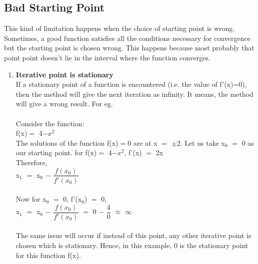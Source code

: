 \documentclass[15pt]{report}
\begin{document}
\subsection*{Bad Starting Point}
This kind of limitation happens when the choice of starting point is wrong. Sometimes, a good function satisfies all the conditions necessary for convergence but the starting point is chosen wrong. This happens because most probably that point point doesn't lie in the interval where the function converges.   
\begin{enumerate}
\item \textbf{Iterative point is stationary}\\If a stationary point of a function is encountered (i.e. the value of f'(x)=0), then the method will give the next iteration as infinity. It means, the method will give a wrong result. For eg. \\ \\
Consider the function:\\
\hspace*{15mm} f(x)$=$ 4$-x^{2}$ \\
The solutions of the function f(x)$=$0 are at x $=$ $\pm$2. Let us take x$_{0}$ $=$ 0 as our starting point. 
for f(x)$=$ 4$-x^{2}$, f'(x) $=$ 2x\\
Therefore, \\
x$_{1}$ $=$ x$_{0}$ $-$ $\dfrac{f(x_{0})}{f'(x_{0})}$ \\ \\
Now for x$_{0}$ $=$ 0, f'(x$_{0}$) $=$ 0,   \\
x$_{1}$ $=$ x$_{0}$ $-$ $\dfrac{f(x_{0})}{f'(x_{0})}$ $=$ 0 $-$ $ \dfrac{4}{0} $ $\approx$ $\infty $ \\ \\
The same issue will occur if instead of this point, any other iterative point is chosen which is stationary. Hence, in this example, 0 is the stationary point for this function f(x). \\


\end{enumerate}
\end{document}
